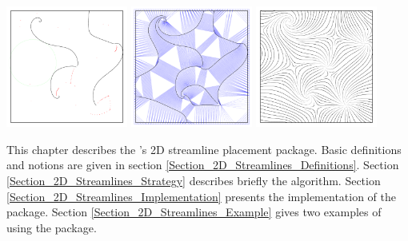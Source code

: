 \newcommand{\streamlinecomment}[1]{}



\begin{ccTexOnly}
\begin{center}
\includegraphics[width=4cm]{Stream_lines_2/1} \hspace*{0.5cm} 
\includegraphics[width=4cm]{Stream_lines_2/2} \hspace*{0.5cm} 
\includegraphics[width=4cm]{Stream_lines_2/3} 
\end{center}
\end{ccTexOnly}


This chapter describes the \cgal's 2D streamline placement package.
Basic definitions and notions are given in section
\ref{Section_2D_Streamlines_Definitions}. Section
\ref{Section_2D_Streamlines_Strategy} describes briefly the algorithm. Section
\ref{Section_2D_Streamlines_Implementation} presents the implementation of the package. Section
\ref{Section_2D_Streamlines_Example} gives two examples of using the package.

